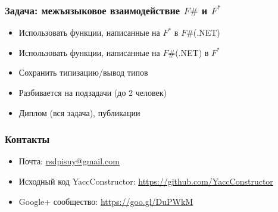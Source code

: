 \documentclass{beamer}
\begin{document}
\begin{frame}
  \transwipe[direction=90]
  \frametitle{Задача: межъязыковое взаимодействие $F\#$ и $F^*$}
  \begin{itemize}
    \item Использовать функции, написанные на $F^*$ в $F\#$(.NET)
    \item Использовать функции, написанные на $F\#$(.NET) в $F^*$
    \item Сохранить типизацию/вывод типов
    \item Разбивается на подзадачи (до 2 человек)
    \item Диплом (вся задача), публикации
  \end{itemize}
\end{frame}
            
\begin{frame}
\transwipe[direction=90]
\frametitle{Контакты}
\begin{itemize}
  \item Почта: \url{rsdpisuy@gmail.com}
  \item Исходный код YaccConstructor: \url{https://github.com/YaccConstructor}
  \item Google+ сообщество: \url{https://goo.gl/DuPWkM}
\end{itemize}
\end{frame}
\end{document}
